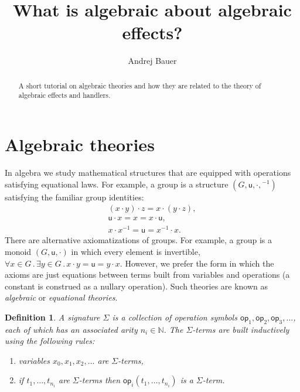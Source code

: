 \documentclass{amsart}
\newcommand{\NN}{\mathbb{N}}
\newcommand{\all}[1]{\forall #1 \,.\,}
\newcommand{\some}[1]{\exists #1 \,.\,}
\newcommand{\op}{\mathsf{op}}
\newtheorem{definition}{Definition}
\begin{document}
\title{What is algebraic about algebraic effects?}

\author{Andrej Bauer}

\begin{abstract}
  A short tutorial on algebraic theories and how they are related to the theory of
  algebraic effects and handlers.
\end{abstract}

\maketitle

\section{Algebraic theories}
\label{sec:algebraic-theories}


In algebra we study mathematical structures that are equipped with operations satisfying
equational laws. For example, a group is a structure $(G, \mathsf{u}, {\cdot}, {}^{-1})$ satisfying
the familiar group identities:
%
\begin{gather*}
  (x \cdot y) \cdot z = x \cdot (y \cdot z),\\
  \mathsf{u} \cdot x = x = x \cdot \mathsf{u},\\
  x \cdot x^{-1} = \mathsf{u} = x^{-1} \cdot x.
\end{gather*}
%
There are alternative axiomatizations of groups. For example, a group is a monoid
$(G, \mathsf{u}, {\cdot})$ in which every element is invertible,
$\all{x \in G} \some{y \in G} x \cdot y = \mathsf{u} = y \cdot x$. However, we prefer the
form in which the axioms are just equations between terms built from variables and
operations (a constant is construed as a nullary operation). Such theories are known as
\emph{algebraic} or \emph{equational theories}.


\begin{definition}
  A \emph{signature $\Sigma$} is a collection of \emph{operation symbols}
  $\op_1, \op_2, \op_3, \ldots$, each of which has an associated \emph{arity}
  $n_i \in \NN$. The \emph{$\Sigma$-terms} are built inductively using the following
  rules:
  \begin{enumerate}
  \item \emph{variables} $x_0, x_1, x_2, \ldots$ are $\Sigma$-terms,
  \item if $t_1, \ldots, t_{n_i}$ are $\Sigma$-terms then $\op_i(t_1, \ldots, t_{n_i})$ is
    a $\Sigma$-term.
  \end{enumerate}
\end{definition}
\end{document}
